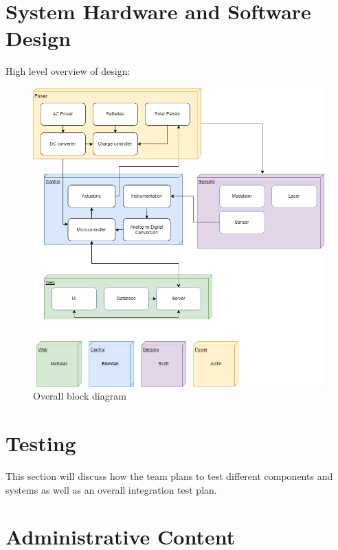 \documentclass[12pt]{article}
\begin{document}
\section{System Hardware and Software Design}   %
High level overview of design:
\begin{figure}[H]
    \caption{Overall block diagram}
    \centering
    \includegraphics[width=\textwidth]{images/Overall Block Diagram.png}
\end{figure}
\section{Testing}                               %
This section will discuss how the team plans to test different components and systems as well as an overall integration test plan.

\section{Administrative Content}                %
\end{document}
